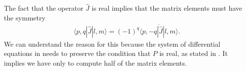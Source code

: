 \documentclass[thesis.tex]{subfiles}
\begin{document}
The fact that the operator $\hat J$ is real implies that the matrix elements must have the symmetry
\begin{align*}
	\langle p, q|\hat J |l,m\rangle = (-1)^q \overline{\langle p, -q|\hat J |l,m\rangle}.
\end{align*}
We can understand the reason for this because the system of differential equations in  needs to preserve the condition that $P$ is real, as stated in . It implies we have only to compute half of the matrix elements.
\end{document}
